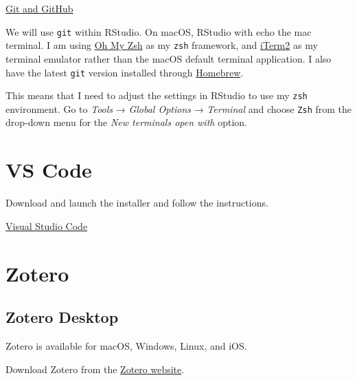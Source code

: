 \documentclass[
  letterpaper,
  DIV=11,
  numbers=noendperiod]{scrreprt}
\begin{document}
\href{https://github.com/carpentries-incubator/reproducible-publications-quarto/blob/main/setup.md}{Git
and GitHub}

\begin{tcolorbox}[enhanced jigsaw, colback=white, breakable, titlerule=0mm, leftrule=.75mm, opacitybacktitle=0.6, bottomtitle=1mm, rightrule=.15mm, coltitle=black, arc=.35mm, bottomrule=.15mm, toprule=.15mm, title=\textcolor{quarto-callout-tip-color}{\faLightbulb}\hspace{0.5em}{Tip}, left=2mm, opacityback=0, colbacktitle=quarto-callout-tip-color!10!white, colframe=quarto-callout-tip-color-frame, toptitle=1mm]

We will use \texttt{git} within RStudio. On macOS, RStudio with echo the
mac terminal. I am using \href{https://ohmyz.sh/}{Oh My Zsh} as my
\texttt{zsh} framework, and \href{https://iterm2.com/}{iTerm2} as my
terminal emulator rather than the macOS default terminal application. I
also have the latest \texttt{git} version installed through
\href{https://brew.sh/}{Homebrew}.

This means that I need to adjust the settings in RStudio to use my
\texttt{zsh} environment. Go to \emph{Tools} → \emph{Global Options} →
\emph{Terminal} and choose \texttt{Zsh} from the drop-down menu for the
\emph{New terminals open with} option.

\end{tcolorbox}

\section{VS Code}\label{vs-code}

Download and launch the installer and follow the instructions.

\href{https://code.visualstudio.com/}{Visual Studio Code}

\section{Zotero}\label{zotero}

\subsection{Zotero Desktop}\label{zotero-desktop}

Zotero is available for macOS, Windows, Linux, and iOS.

Download Zotero from the \href{https://www.zotero.org/}{Zotero website}.
\end{document}
